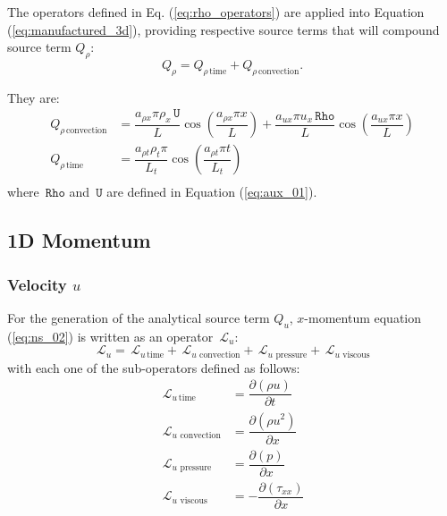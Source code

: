 \documentclass[10pt]{article}
\newcommand{\Diff}[2] {\dfrac{\partial( #1)}{\partial #2}}
\newcommand{\Rho}{\,\mathtt{Rho}}
\newcommand{\U}{\,\mathtt{U}}
\newcommand{\Lo}{\,\mathcal{L}}
\newcommand{\timee}{\,\text{time}}
\newcommand{\convection}{\,\text{convection}}
\newcommand{\viscous}{\,\text{viscous}}
\newcommand{\pressure}{\,\text{pressure}}
\begin{document}
The operators defined in Eq. (\ref{eq:rho_operators}) are applied into Equation  (\ref{eq:manufactured_3d}), providing respective source terms that will compound source term $Q_{\rho}$:
\begin{equation*}
 Q_{\rho} = Q_{\rho \, \text{time}}+Q_{\rho \, \text{convection}}.
\end{equation*}


They are:
\begin{equation*}
\begin{split}
 Q_{\rho \convection} &= \dfrac{a_{\rho x} \pi \rho_x \U}{L}  \cos\left(\dfrac{a_{\rho x} \pi x}{L}\right)
+\dfrac{a_{ux} \pi u_x \Rho }{L} \cos\left(\dfrac{a_{ux} \pi x}{L}\right) \\ 
%
Q_{\rho \timee} &= \dfrac{a_{\rho t} \rho_t \pi}{L_t}\cos\left(\dfrac{a_{\rho t} \pi t}{L_t}\right)  \\ 
%
\end{split}
\end{equation*}
where $\Rho$ and $\U$  are defined in Equation (\ref{eq:aux_01}).


\subsection{1D Momentum}


\subsubsection{Velocity $u$}
For the generation of the analytical source term $Q_u$, $x$-momentum equation (\ref{eq:ns_02}) is written as an operator $\Lo_u$:
 $$\Lo_u = \Lo_{u \, \text{time}}+\Lo_{u \, \convection}+\Lo_{u \, \pressure }+\Lo_{u \, \viscous }$$
with each one of the sub-operators defined as follows:
\begin{equation*}
 \begin{split}
\Lo_{u \, \text{time}}&= \Diff{\rho u}{t} \\
\Lo_{u \, \convection}&= \Diff{\rho u^2 }{x} \\
\Lo_{u \, \pressure }&= \Diff{p}{x}\\
\Lo_{u \, \viscous }&= -\Diff{\tau_{xx}}{x}
 \end{split}
\end{equation*}
\end{document}
